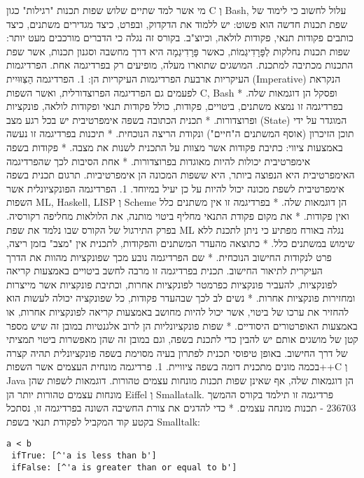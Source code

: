 \begin{טבלא}[!htbp]
מי אשר למד שתיים שלוש שפות תכנות "רגילות" כגון C וְ Bash, עלול לחשוב כי לימוד של שפת תכנות חדשה הוא פשוט: יש ללמוד את הדקדוק, ובפרט, כיצד מגדירים משתנים, כיצד כותבים פקודות תנאי, פקודות לולאה, וכיוצ"ב.
בקורס זה נגלה כי הדברים מורכבים מעט יותר: שפות תכנות נחלקות לְפָּרָדִיגְמוֹת, כאשר פָּרָדִיגְמָה היא דרך מחשבה וסגנון תכנות, אשר שפת התכנות מכתיבה למתכנת. המושגים שתוארו מעלה, מופיעים רק בפרדיגמה אחת.
הפרדיגמות העיקריות
ארבעת הפרדיגמות העיקריות הן:
1. הפרדיגמה הַצִּוּוּיִית (Imperative) הנקראת לפעמים גם הפרדיגמה הפרוצדורלית, ואשר השפות C, Bash ופסקל הן דוגמאות שלה.
* בפרדיגמה זו נמצא משתנים, ביטויים, פקודות, כולל פקודות תנאי ופקודות לולאה, פונקציות ופרוצדורות.
* תכנית הכתובה בשפה אימפרטיבית יש בכל רגע מצב (State) המוגדר על ידי תוכן הזיכרון (אוסף המשתנים ה"חיים") ונקודת הריצה הנוכחית.
* תיכנות בפרדיגמה זו נעשה באמצעות ציווי: כתיבת פקודות אשר מצוות על התכנית לשנות את מצבה.
* פקודות בשפה אימפרטיבית יכולות להיות מאוגדות בפרוצדורות.
* אחת הסיבות לכך שהפרדיגמה האימפרטיבית היא הנפוצה ביותר, היא ששפות המכונה הן אימפרטיביות. תרגום תכנית בשפה אימפרטיבית לשפת מכונה יכול להיות על כן יעיל במיוחד.
1. הפרדיגמה הפונקציונלית אשר השפות ML, Haskell, LISP וְ Scheme הן דוגמאות שלה.
* בפרדיגמה זו אין משתנים כלל ואין פקודות.
* את מקום פקודת התנאי מחליף ביטוי מותנה, את הלולאות מחליפה רקורסיה. בפרק התירגול של הקורס שבו נלמד את שפת ML נגלה באורח מפתיע כי ניתן לתכנת ללא שימוש במשתנים כלל.
* כתוצאה מהעדר המשתנים והפקודות, לתכנית אין "מצב" בזמן ריצה, פרט לנקודות החישוב הנוכחית.
* שם הפרדיגמה נובע מכך שפונקציות מהוות את הדרך העיקרית לתיאור החישוב. תכנית בפרדיגמה זו מרבה לחשב ביטויים באמצעות קריאה לפונקציות, להעביר פונקציות כפרמטר לפונקציות אחרות, וכתיבת פונקציות אשר מייצרות ומחזירות פונקציות אחרות.
* נשים לב לכך שבהעדר פקודות, כל שפונקציה יכולה לעשות הוא להחזיר את ערכו של ביטוי, אשר יכול להיות מחושב באמצעות קריאה לפונקציות אחרות, או באמצעות האופרטורים היסודיים.
* שפות פונקציונליות הן לרוב אלגנטיות במובן זה שיש מספר קטן של מושגים אותם יש להבין כדי לתכנת בשפה, וגם במובן זה שהן מאפשרות ביטוי תמציתי של דרך החישוב. באופן טיפוסי תכנית לפתרון בעיה מסוימת בשפה פונקציונלית תהיה קצרה בכמה מונים מתכנית דומה בשפה ציוויית.
1. פרדיגמה מונחית העצמים אשר השפות++C וְ Java הן דוגמאות שלה, אף שאינן שפות תכנות מונחות עצמים טהורות. דוגמאות לשפות שהן מונחות עצמים טהורות יותר הן Eiffel וְ Smallatalk. פרדיגמה זו תילמד בקורס ההמשך 236703 - תכנות מונחה עצמים.
* כדי להדגים את צורת החשיבה השונה בפרדיגמה זו, נסתכל בקטע קוד המקביל לפקודת תנאי בשפת Smalltalk:

\begin{verbatim}
a < b
 ifTrue: [^'a is less than b']
 ifFalse: [^'a is greater than or equal to b']
\end{verbatim}


\end{טבלא}
